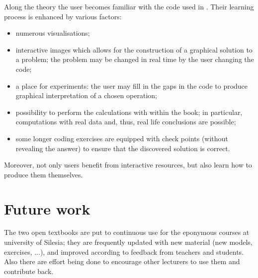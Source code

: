 \documentclass{deliverablereport}
\begin{document}
Along the theory the user becomes familiar with the code used in
\Sage. Their learning process is enhanced by various factors:
\begin{itemize}
\item numerous visualisations;
\item interactive images which allows for the construction of a
  graphical solution to a problem; the problem may be changed in real
  time by the user changing the code;
\item a place for experiments: the user may fill in the gaps in the code
  to produce graphical interpretation of a chosen operation;
\item possibility to perform the calculations with \Sage within the
  book; in particular, computations with real data and, thus, real
  life conclusions are possible;
\item some longer coding exercises are equipped with check points
  (without revealing the answer) to ensure that the discovered
  solution is correct.
\end{itemize}

Moreover, not only users benefit from interactive resources, but also
learn how to produce them themselves.

\section{Future work}


The two open textbooks are put to continuous use for the eponymous
courses at university of Silesia; they are frequently updated with new
material (new models, exercises, ...), and improved according to
feedback from teachers and students. Also there are effort being done
to encourage other lecturers to use them and contribute back.
\end{document}
